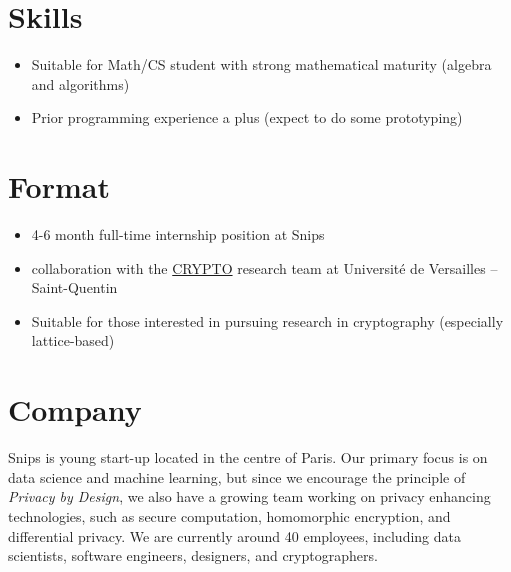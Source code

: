 \documentclass{article}
\begin{document}
\section*{Skills}
\begin{itemize}
\item Suitable for Math/CS student with strong mathematical maturity (algebra and algorithms)
\item Prior programming experience a plus (expect to do some prototyping)
\end{itemize}

\section*{Format}
\begin{itemize}
\item 4-6 month full-time internship position at Snips 
\item collaboration with the
  \href{http://lmv.math.cnrs.fr/equipes/crypto/}{CRYPTO} research team
  at Université de Versailles -- Saint-Quentin
\item Suitable for those interested in pursuing research in cryptography (especially lattice-based)
\end{itemize}

\section*{Company}
Snips is young start-up located in the centre of Paris. Our primary focus is on data science and machine learning, but since we encourage the principle of \emph{Privacy by Design}, we also have a growing team working on privacy enhancing technologies, such as secure computation, homomorphic encryption, and differential privacy. We are currently around 40 employees, including data scientists, software engineers, designers, and cryptographers.
\end{document}
